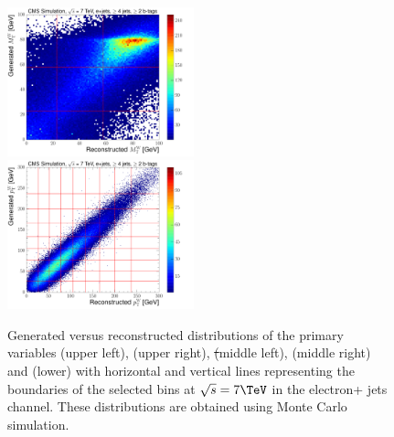 \begin{figure}[hbtp]
     \includegraphics[width=0.48\textwidth]{Chapters/04_Analysis/04b_XSections/images/binning/electron_MT_7TeV.pdf}\\
	 \includegraphics[width=0.48\textwidth]{Chapters/04_Analysis/04b_XSections/images/binning/electron_WPT_7TeV.pdf}\hfill
	 \caption{Generated versus reconstructed distributions of the primary variables \met (upper left), \HT (upper
	 right), \st (middle left), \mt (middle right) and \wpt (lower) with horizontal and vertical lines
	 representing the boundaries of the selected bins at $\sqrt{s}=7\TeV$ in the electron+ jets channel. These
	 distributions are obtained using \ttbar Monte Carlo simulation.}
     \label{fig:binning_7TeV_electron}
\end{figure}

